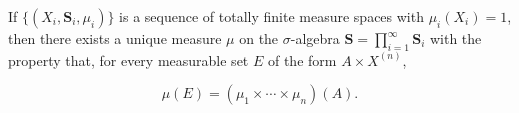 If $\{(X_i, \mathbf{S}_i, \mu_i)\}$ is a sequence of totally finite measure spaces with $\mu_i(X_i) = 1$, then there exists a unique measure $\mu$ on the $\sigma$-algebra $\mathbf{S} = \prod_{i=1}^{\infty} \mathbf{S}_i$ with the property that, for every measurable set $E$ of the form $A \times X^{(n)}$,

$$\mu(E) = (\mu_1 \times \cdots \times \mu_n)(A).$$
